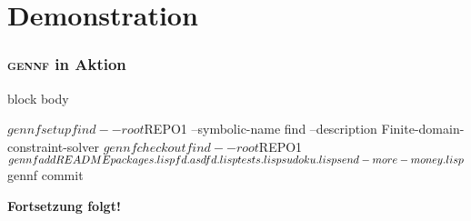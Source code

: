 \documentclass[german, presentation]{beamer}
\newcommand{\GENNF}{\textsc{gennf}}
\begin{document}
\section{Demonstration}


\begin{frame}[fragile]
  \frametitle{\GENNF{} in Aktion}
  \begin{beamercolorbox}{block body}
    {\small
\begin{semiverbatim}
 $ gennf setup find --root $REPO1 --symbolic-name find
     --description Finite-domain-constraint-solver \vspace{5pt}
 $ gennf checkout find --root $REPO1 \vspace{5pt}
 $ gennf add README packages.lisp fd.asd fd.lisp
     tests.lisp sudoku.lisp send-more-money.lisp \vspace{5pt}
 $ gennf commit
\end{semiverbatim}
    }
  \end{beamercolorbox}
  
  \bigskip

  \begin{center}
    {\Large\bf \alert{Fortsetzung folgt!}}
  \end{center}

\end{frame}
\end{document}
